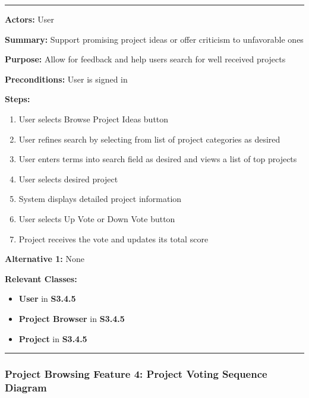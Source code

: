 \documentclass[twoside,letterpaper]{article}
\begin{document}
\vspace{2pt}
\hrule
\vspace{8pt}
\textbf{Actors:} User \newline

\noindent\textbf{Summary:} Support promising project ideas or offer criticism to unfavorable ones  \newline

\noindent\textbf{Purpose:} Allow for feedback and help users search for well received projects \newline

\noindent\textbf{Preconditions:} User is signed in \newline

\noindent\textbf{Steps:} \begin{enumerate}
	\item User selects Browse Project Ideas button
	\item User refines search by selecting from list of project categories as desired
	\item User enters terms into search field as desired and views a list of top projects
	\item User selects desired project
	\item System displays detailed project information
	\item User selects Up Vote or Down Vote button
	\item Project receives the vote and updates its total score
\end{enumerate}
\noindent\textbf{Alternative 1:} None \newline


\noindent\textbf{Relevant Classes:}
\begin{itemize}
	\item \textbf{User} in \textbf{S3.4.5}
	\item \textbf{Project Browser} in \textbf{S3.4.5}
	\item \textbf{Project} in \textbf{S3.4.5}
\end{itemize}
\hrule
\newpage
\subsubsection[Project Browsing Feature 4: Project Voting Sequence Diagram]{\rmfamily\bfseries\color{black}
	Project Browsing Feature 4: Project Voting Sequence Diagram}
\hypertarget{RefHeading22059017292}{}

\bigskip
\end{document}
